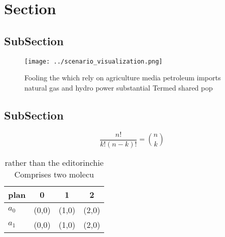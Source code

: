 \documentclass[a4paper]{article}
\begin{document}
\section{Section}

\subsection{SubSection}

\begin{figure}
\centering
\texttt{[image: ../scenario\_visualization.png]}
\caption{Fooling the which rely on agriculture media petroleum imports natural gas and hydro power substantial Termed shared pop
}
\end{figure}
 
\subsection{SubSection}

\[ \frac{n!}{k!(n-k)!} = \binom{n}{k} \]

\begin{table}
\begin{adjustbox}{width=0.6\columnwidth}
\begin{tabular}{|l|l|l|l|}
\hline
\textbf{plan} & \multicolumn{1}{c|}{\textbf{0}} & \multicolumn{1}{c|}{\textbf{1}} & \multicolumn{1}{c|}{\textbf{2}} \\ \hline
\textbf{$a_0$}  & (0,0) & (1,0) & (2,0) \\ \hline
\textbf{$a_1$}  & (0,0) & (1,0) & (2,0) \\ \hline
\end{tabular}
\end{adjustbox}
\caption{rather than the editorinchie Comprises two molecu
}
\end{table}
\end{document}
